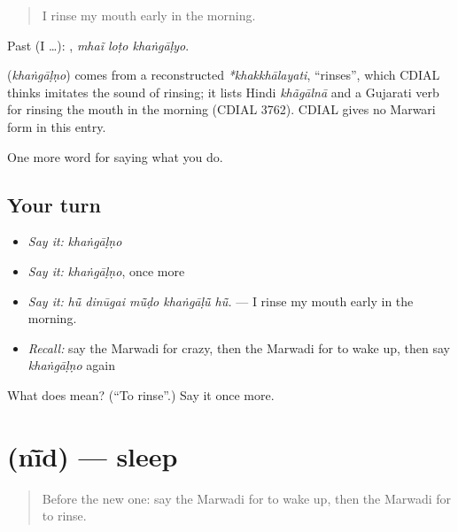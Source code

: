 \begin{quote}
I rinse my mouth early in the morning.
\end{quote}

Past (I …):   , \emph{mhaĩ loṭo khaṅgāḷyo}.

\begin{cousinweb}
\textbf{} (\emph{khaṅgāḷṇo}) comes from a reconstructed \emph{*khakkhālayati}, \textquotedblleft{}rinses\textquotedblright{}, which CDIAL thinks imitates the sound of rinsing; it lists Hindi \emph{khãgālnā} and a Gujarati verb for rinsing the mouth in the morning (CDIAL 3762). CDIAL gives no Marwari form in this entry.
\end{cousinweb}

\begin{grammarlens}[title={What you've built}]
One more word for saying what you do.
\end{grammarlens}

\subsection*{Your turn}
\begin{itemize}
\raggedright
  \item \emph{Say it:} \emph{khaṅgāḷṇo}
  \item \emph{Say it:} \emph{khaṅgāḷṇo}, once more
  \item \emph{Say it:} \emph{hū̃ dinūgai mū̃ḍo khaṅgāḷū̃ hū̃.} — I rinse my mouth early in the morning.
  \item \emph{Recall:} say the Marwadi for crazy, then the Marwadi for to wake up, then say \emph{khaṅgāḷṇo} again
\end{itemize}

\begin{tcolorbox}[breakable,colback=teal!4,colframe=teal!35!black,title={Before you move on}]
What does  mean? (\textquotedblleft{}To rinse\textquotedblright{}.) Say it once more.
\end{tcolorbox}
\section[\texorpdfstring{\mw{नींद} (nī̃d)}{नींद (nī̃d)}]{ (nī̃d) — sleep}

\label{lesson:MW-C166-nid}



\begin{quote}
Before the new one: say the Marwadi for to wake up, then the Marwadi for to rinse.
\end{quote}

